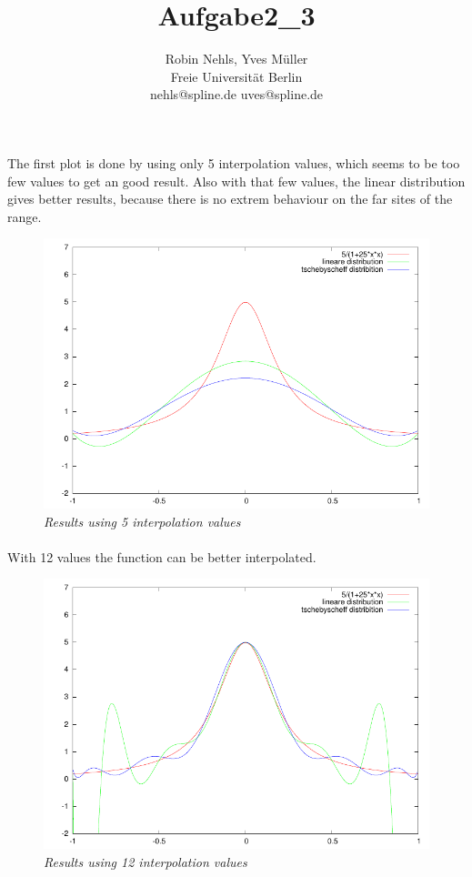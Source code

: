 \documentclass[11pt,a4paper,notitlepage,onecolumn]{article}
\title{Aufgabe2\_3}
\author{Robin Nehls, Yves Müller\\
  Freie Universit\"at Berlin\\
  nehls@spline.de uves@spline.de }
\date{}
\begin{document}
\maketitle

\paragraph{}
The first plot is done by using only 5 interpolation values, which seems 
to be too few values to get an good result. Also with that few values, the
linear distribution gives better results, because there is no extrem 
behaviour on the far sites of the range. 

\begin{figure}
\centering
\includegraphics[width=\textwidth]{aufgabe3-2based5.pdf}
\caption{\em \small Results using 5 interpolation values}
\end{figure}


\paragraph{}
With 12 values the function can be better interpolated.

\begin{figure}
\centering
\includegraphics[width=\textwidth]{aufgabe3-2based12.pdf}
\caption{\em \small Results using 12 interpolation values}
\end{figure}
\end{document}
